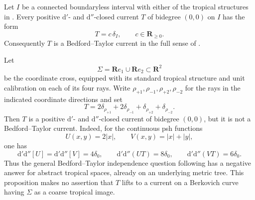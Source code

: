 \begin{lemma}
\label{lem:p213-triv-interval-current}
Let $I$ be a connected boundaryless interval with either of the tropical
structures in \cite[\S\S6.7.1--6.7.2]{CLD25}.  Every positive
$\mathrm d'$- and $\mathrm d''$-closed current $T$ of bidegree
$(0,0)$ on $I$ has the form
\begin{equation}
                         T=c\,\delta_I,
            \qquad c\in\mathbf R_{\geq 0}.
\label{eq:p213-triv-interval-classification}
\end{equation}
Consequently $T$ is a Bedford--Taylor current in the full sense of
\cite[Definition~8.6.2]{CLD25}.
\end{lemma}

\begin{proposition}
\label{prop:p213-triv-abstract-cross-counterexample}
Let
\[
 \Sigma=\mathbf R e_1\cup\mathbf R e_2\subset\mathbf R^2
\]
be the coordinate cross, equipped with its standard tropical structure and
unit calibration on each of its four rays.  Write
$\rho_{+1},\rho_{-1},\rho_{+2},\rho_{-2}$ for the rays in the indicated
coordinate directions and set
\begin{equation}
 T=2\delta_{\rho_{+1}}+2\delta_{\rho_{-1}}
      +\delta_{\rho_{+2}}+\delta_{\rho_{-2}}.
\label{eq:p213-triv-abstract-cross-current}
\end{equation}
Then $T$ is a positive $\mathrm d'$- and $\mathrm d''$-closed current of
bidegree $(0,0)$, but it is not a Bedford--Taylor current.  Indeed, for
the continuous psh functions
\begin{equation}
                U(x,y)=2|x|,
       \qquad   V(x,y)=|x|+|y|,
\label{eq:p213-triv-abstract-cross-potentials}
\end{equation}
one has
\begin{equation}
 \mathrm d'\mathrm d''[U]=\mathrm d'\mathrm d''[V]=4\delta_0,
 \qquad
 \mathrm d'\mathrm d''(UT)=8\delta_0,
 \qquad
 \mathrm d'\mathrm d''(VT)=6\delta_0.
\label{eq:p213-triv-abstract-cross-defect}
\end{equation}
Thus the general Bedford--Taylor independence question following
\cite[\S8.6.1]{CLD25} has a negative answer for abstract tropical spaces,
already on an underlying metric tree.  This proposition makes no assertion
that $T$ lifts to a current on a Berkovich curve having $\Sigma$ as a
coarse tropical image.
\end{proposition}

